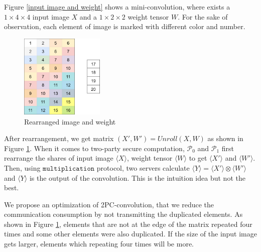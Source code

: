 \documentclass[letterpaper]{article} %
\begin{document}
    Figure \ref{input image and weight} shows a mini-convolution,
    where exists a $1\times 4\times 4$ input image $X$  and a $1\times 2\times 2$ weight tensor $W$.
    For the sake of observation, each element of image is marked with different color and number.


    \begin{figure}[htbp]
        \centering
        \includegraphics[width=4cm]{new_unrolling2.png}
        \caption{Rearranged image and weight}
        \label{rearrangement of image and weight}
    \end{figure}

    After rearrangement, we get matrix $(X',W')=Unroll(X,W)$ as shown in Figure \ref{rearrangement of image and weight}.
    When it comes to two-party secure computation,
    $\mathcal{P}_{0}$ and $\mathcal{P}_{1}$ first rearrange the shares of input image $\langle X\rangle$,
    weight tensor $\langle W\rangle$
    to get $\langle X'\rangle$ and $\langle W'\rangle$.
    Then, using $\mathtt{multiplication}$ protocol,
    two servers calculate $\langle Y\rangle=\langle X'\rangle\otimes \langle W'\rangle$
    and $\langle Y\rangle$ is the output of the convolution.
    This is the intuition idea but not the best.

    We propose an optimization of 2PC-convolution,
    that we reduce the communication consumption by not transmitting the duplicated elements.
    As shown in Figure \ref{rearrangement of image and weight},
    elements that are not at the edge of the matrix repeated four times
    and some other elements were also duplicated.
    If the size of the input image gets larger, elements which repeating four times will be more.
\end{document}
